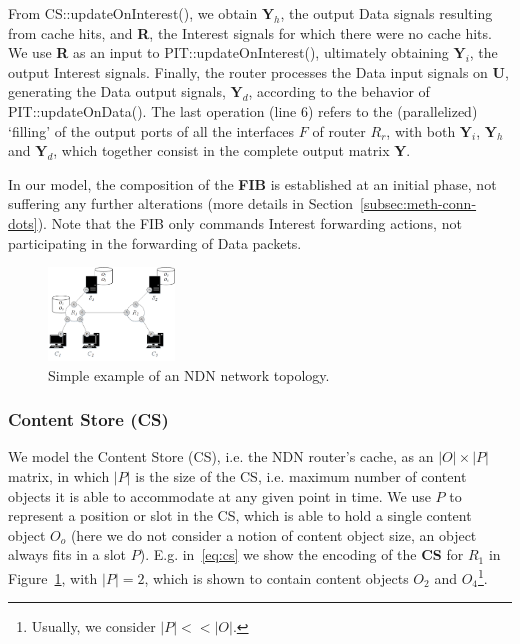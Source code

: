From CS::updateOnInterest(), we obtain $\textbf{Y}_h$, the output Data signals 
resulting from cache hits, and \textbf{R}, the Interest signals for which 
there were no cache hits. We use \textbf{R} as an input to PIT::updateOnInterest(), 
ultimately obtaining $\textbf{Y}_i$, the output Interest signals. Finally, 
the router processes the Data input signals on \textbf{U}, generating the 
Data output signals, $\textbf{Y}_d$, according to the behavior of 
PIT::updateOnData(). The last 
operation (line 6) refers to 
the (parallelized) `filling' of the output ports of all the interfaces $F$ of router $R_r$, 
with both $\textbf{Y}_i$, $\textbf{Y}_h$ and $\textbf{Y}_d$, which together 
consist in the complete output matrix \textbf{Y}.\shortvertbreak

In our model, the composition of the \textbf{FIB} is established at an initial phase, 
not suffering any further alterations (more details in 
Section~\ref{subsec:meth-conn-dots}). Note 
that the FIB only commands Interest forwarding actions, not participating in the 
forwarding of Data packets.\shortvertbreak

\begin{figure}[h!]

    \centering
    \includegraphics[width=0.30\textwidth]{figures/fib-topo.png}
    \cprotect\caption{Simple example of an NDN network topology.}
    \label{fig:fib-topo}

\end{figure}

\subsubsection{Content Store (CS)}
\label{subsec:meth-cs}

We model the Content Store (CS), i.e. the NDN router's cache, as an $|O| 
\times |P|$ matrix, in which $|P|$ is the size of the CS, i.e. maximum 
number of content objects it is able to accommodate at any given point in time. 
We use $P$ to represent a position or slot in the CS, which is able to hold a single 
content object $O_o$ (here we do not consider a notion of content object size, 
an object always fits in a slot $P$). E.g. in~\ref{eq:cs} we show the encoding 
of the \textbf{CS} for $R_1$ in Figure~\ref{fig:fib-topo}, with $|P| = 2$, 
which is shown to contain content objects $O_2$ and $O_4$\footnote{Usually, 
we consider $|P| << |O|$.}.

